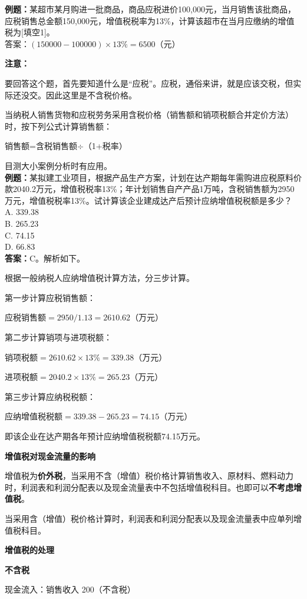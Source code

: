 \textbf{例题：}某超市某月购进一批商品，商品应税进价100,000元，当月销售该批商品，应税销售总金额150,000元，增值税税率为13\%，计算该超市在当月应缴纳的增值税为[填空1]。\\
答案：$(150000-100000) \times 13\% = 6500$（元）

\textbf{注意：}

要回答这个题，首先要知道什么是“应税”。应税，通俗来讲，就是应该交税，但实际还没交。因此这里是不含税价格。

当纳税人销售货物和应税劳务采用含税价格（销售额和销项税额合并定价方法）时，按下列公式计算销售额：

销售额=含税销售额$\div$（1+税率）

目测大小案例分析时有应用。\\
\textbf{例题：}某拟建工业项目，根据产品生产方案，计划在达产期每年需购进应税原料价款2040.2万元，增值税税率13\%；年计划销售自产产品1万吨，含税销售额为2950万元，增值税税率13\%。试计算该企业建成达产后预计应纳增值税税额是多少？\\
A. 339.38\\
B. 265.23\\
C. 74.15\\
D. 66.83\\
\textbf{答案：}C。解析如下。

根据一般纳税人应纳增值税计算方法，分三步计算。

第一步计算应税销售额：

应税销售额$=2950/1.13=2610.62$（万元）

第二步计算销项与进项税额：

销项税额$=2610.62×13\%=339.38$（万元）

进项税额$=2040.2×13\%=265.23$（万元）

第三步计算应纳税税额：

应纳增值税税额$=339.38-265.23=74.15$（万元）

即该企业在达产期各年预计应纳增值税税额74.15万元。

\noindent \textbf{增值税对现金流量的影响}

增值税为\textbf{价外税}，当采用不含（增值）税价格计算销售收入、原材料、燃料动力时，利润表和利润分配表以及现金流量表中不包括增值税科目。也即可以\textbf{不考虑增值税}。

当采用含（增值）税价格计算时，利润表和利润分配表以及现金流量表中应单列增值税科目。

\noindent \textbf{增值税的处理}

\noindent \textbf{不含税}

现金流入：销售收入 200（不含税）

